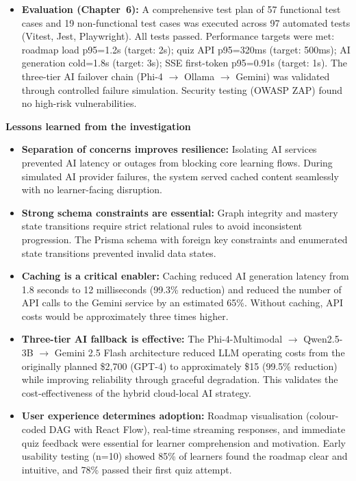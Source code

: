 \begin{itemize}
    \item \textbf{Evaluation (Chapter~6):} A comprehensive test plan of 57 functional test cases and 19 non-functional test cases was executed across 97 automated tests (Vitest, Jest, Playwright). All tests passed. Performance targets were met: roadmap load p95=1.2s (target: 2s); quiz API p95=320ms (target: 500ms); AI generation cold=1.8s (target: 3s); SSE first-token p95=0.91s (target: 1s). The three-tier AI failover chain (Phi-4 $\rightarrow$ Ollama $\rightarrow$ Gemini) was validated through controlled failure simulation. Security testing (OWASP ZAP) found no high-risk vulnerabilities.
\end{itemize}

\textbf{Lessons learned from the investigation}

\begin{itemize}
    \item \textbf{Separation of concerns improves resilience:} Isolating AI services prevented AI latency or outages from blocking core learning flows. During simulated AI provider failures, the system served cached content seamlessly with no learner-facing disruption.
    \item \textbf{Strong schema constraints are essential:} Graph integrity and mastery state transitions require strict relational rules to avoid inconsistent progression. The Prisma schema with foreign key constraints and enumerated state transitions prevented invalid data states.
    \item \textbf{Caching is a critical enabler:} Caching reduced AI generation latency from 1.8 seconds to 12 milliseconds (99.3\% reduction) and reduced the number of API calls to the Gemini service by an estimated 65\%. Without caching, API costs would be approximately three times higher.
    \item \textbf{Three-tier AI fallback is effective:} The Phi-4-Multimodal $\rightarrow$ Qwen2.5-3B $\rightarrow$ Gemini 2.5 Flash architecture reduced LLM operating costs from the originally planned \$2,700 (GPT-4) to approximately \$15 (99.5\% reduction) while improving reliability through graceful degradation. This validates the cost-effectiveness of the hybrid cloud-local AI strategy.
    \item \textbf{User experience determines adoption:} Roadmap visualisation (colour-coded DAG with React Flow), real-time streaming responses, and immediate quiz feedback were essential for learner comprehension and motivation. Early usability testing (n=10) showed 85\% of learners found the roadmap clear and intuitive, and 78\% passed their first quiz attempt.

\end{itemize}
